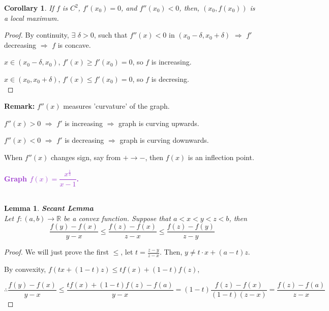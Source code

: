 \documentclass[12pt]{article}
\theoremstyle{plain}
\newtheorem{lemma}{Lemma}[subsection]
\newtheorem{corollary}{Corollary}[subsection]
\begin{document}
		\begin{corollary}
			If $f$ is $C^2$, $f'(x_0) = 0$, and $f''(x_0) < 0$, then, $(x_0, f(x_0))$
			is a local maximum. 
		\end{corollary}
		\begin{proof}
			By continuity, $\exists $ $\delta>0$, such that $f''(x) < 0$
			in $(x_0-\delta, x_0+\delta)$ $\Rightarrow$ $f'$ decreasing $\Rightarrow$
			$f$ is concave. 

			$x \in (x_0-\delta, x_0)$, $f'(x)\geq f'(x_0) = 0$,
			so $f$ is increasing. 

			$x \in (x_0, x_0+\delta)$, $f'(x) \leq f'(x_0) = 0$,
			so $f$ is decresing. \\
		\end{proof}


		\textbf{Remark:}
		$f''(x)$ measures 'curvature' of the graph.
		\begin{description}
			\item $f''(x)>0$ $\Rightarrow$ $f'$ is increasing
							$\Rightarrow$ graph is curving upwards.

			
			\item $f''(x)<0$ $\Rightarrow$ $f'$ is decreasing
							$\Rightarrow$ graph is curving downwards. 
		\end{description}

		When $f''(x)$ changes sign, say from $+ \to -$, then $f(x)$ is an 
		inflection point. 


		\textcolor{DarkOrchid} 
		{\textbf{Graph $f(x) =\dfrac{x^{\frac13}}{x-1}$.}}\\\\


		
		\begin{lemma}{\textbf{Secant Lemma}}\\
			Let $f:(a,b)\to \mathbb{R}$ be a convex function. Suppose that 
			$a<x<y<z<b$,
			then 
			\[\frac{f(y)-f(x)}{y-x}\leq\frac{f(z)-f(x)}{z-x}
			\leq\frac{f(z)-f(y)}{z-y}\]
		\end{lemma}
		\begin{proof}
			We will just prove the first $\leq$, let $t=\frac{z-y}{z-x}$. 
			Then, $y\neq t \cdot x+(a-t)z$.

			By convexity, $f(tx+(1-t)z)\leq tf(x)+(1-t)f(z)$,

			
			\[\therefore \frac{f(y)-f(x)}{y-x} \leq \frac{tf(x)+(1-t)f(z)-f(a)}{y-x}
			=(1-t)\frac{f(z)-f(x)}{(1-t)(z-x)}=\frac{f(z)-f(a)}{z-x}\]
		\end{proof}
\end{document}
